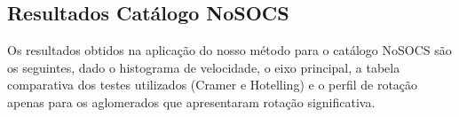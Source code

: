\begin{anexosenv}
\chapter{Resultados Catálogo NoSOCS}
\label{chap:anexonosocs}
Os resultados obtidos na aplicação do nosso método para o catálogo NoSOCS são os seguintes, dado o histograma de velocidade, o eixo principal, a tabela comparativa dos testes utilizados (Cramer e Hotelling) e o perfil de rotação apenas para os aglomerados que apresentaram rotação significativa.

\begin{figure}[H] %
\vspace{-2pt}
\centering
{}

\end{figure}
\end{anexosenv}
